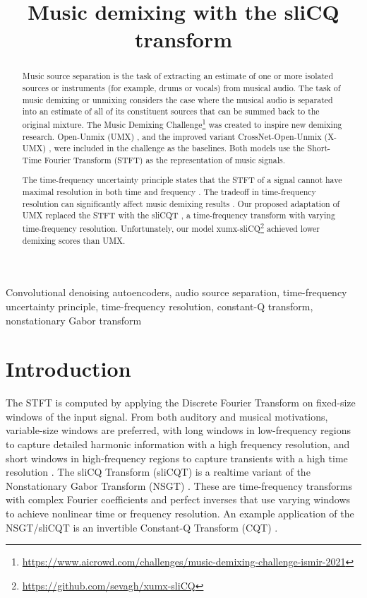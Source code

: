\documentclass{article}
\title{Music demixing with the sliCQ transform}
\begin{document}
\ninept
%
\maketitle
%
\begin{abstract}
	Music source separation is the task of extracting an estimate of one or more isolated sources or instruments (for example, drums or vocals) from musical audio. The task of music demixing or unmixing considers the case where the musical audio is separated into an estimate of all of its constituent sources that can be summed back to the original mixture. The Music Demixing Challenge\footnote{\url{https://www.aicrowd.com/challenges/music-demixing-challenge-ismir-2021}} \cite{mdx21} was created to inspire new demixing research. Open-Unmix (UMX) \cite{umx}, and the improved variant CrossNet-Open-Unmix (X-UMX) \cite{xumx}, were included in the challenge as the baselines. Both models use the Short-Time Fourier Transform (STFT) as the representation of music signals.

	The time-frequency uncertainty principle states that the STFT of a signal cannot have maximal resolution in both time and frequency \cite{gabor1946}. The tradeoff in time-frequency resolution can significantly affect music demixing results \cite{tftradeoff1}. Our proposed adaptation of UMX replaced the STFT with the sliCQT \cite{slicq}, a time-frequency transform with varying time-frequency resolution. Unfortunately, our model xumx-sliCQ\footnote{\url{https://github.com/sevagh/xumx-sliCQ}} achieved lower demixing scores than UMX.

\end{abstract}
%
\begin{keywords}
Convolutional denoising autoencoders, audio source separation, time-frequency uncertainty principle, time-frequency resolution, constant-Q transform, nonstationary Gabor transform
\end{keywords}
%
\section{Introduction}
\label{sec:intro}

The STFT is computed by applying the Discrete Fourier Transform on fixed-size windows of the input signal. From both auditory and musical motivations, variable-size windows are preferred, with long windows in low-frequency regions to capture detailed harmonic information with a high frequency resolution, and short windows in high-frequency regions to capture transients with a high time resolution \cite{doerflerphd}. The sliCQ Transform (sliCQT) \cite{slicq} is a realtime variant of the Nonstationary Gabor Transform (NSGT) \cite{balazs}. These are time-frequency transforms with complex Fourier coefficients and perfect inverses that use varying windows to achieve nonlinear time or frequency resolution. An example application of the NSGT/sliCQT is an invertible Constant-Q Transform (CQT) \cite{jbrown}.
\end{document}
